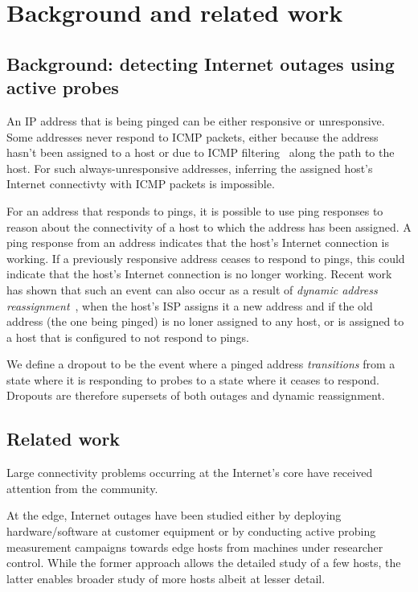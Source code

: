 \section{Background and related work}
\label{sec:bg}

\subsection{Background: detecting Internet outages using active probes}

An IP address that is being pinged can be either responsive or
unresponsive. Some addresses never respond to ICMP packets, either
because the address hasn't been assigned to a host or due to ICMP
filtering~\cite{v4-census-imc16} along the path to the host. For such always-unresponsive
addresses, inferring the assigned host's Internet connectivty with ICMP packets is impossible.

For an address that responds to pings, it is possible to use ping
responses to reason about the connectivity of a host to which the address has been
assigned. A ping response from an address indicates that the
host's Internet connection is working. If a previously
responsive address ceases to respond to pings, this could indicate
that the host's Internet connection is no longer working. Recent work
has shown that such an event can also occur as a result of \emph{dynamic
address reassignment}~\cite{addrchange-imc}, when the host's ISP
assigns it a new address and if the old address (the one being pinged)
is no loner assigned to any host, or is assigned to a host that is
configured to not respond to pings.

We define a dropout to be the event where a pinged address \emph{transitions}
from a state where it is responding to probes to a state where it
ceases to respond. Dropouts are therefore supersets of both outages
and dynamic reassignment.

\subsection{Related work}

Large connectivity problems occurring at the Internet's core have
received attention from the community. 

At the edge, Internet outages have been studied either by deploying
hardware/software at customer equipment or by conducting active
probing measurement campaigns towards edge hosts from machines under
researcher control. While the former approach allows the detailed study of
a few hosts, the latter enables broader study of more hosts albeit at
lesser detail.

